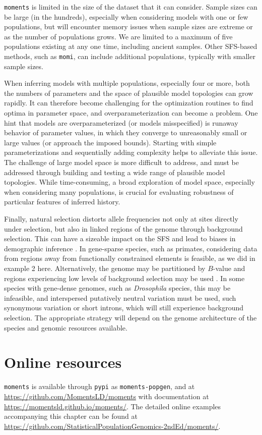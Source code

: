 \documentclass[]{article}
\newcommand{\moments}{\texttt{moments}\xspace}
\newcommand{\momi}{\texttt{momi}\xspace}
\begin{document}
\moments is limited in the size of the dataset that it can consider. Sample
sizes can be large (in the hundreds), especially when considering models with
one or few populations, but will encounter memory issues when sample sizes are
extreme or as the number of populations grows. We are limited to a maximum of
five populations existing at any one time, including ancient samples. Other
SFS-based methods, such as \momi \citep{kamm2020efficiently, dilber2024faster},
can include additional populations, typically with smaller sample sizes.

When inferring models with multiple populations, especially four or more, both
the numbers of parameters and the space of plausible model topologies can grow
rapidly. It can therefore become challenging for the optimization routines to
find optima in parameter space, and overparameterization can become a problem.
One hint that models are overparameterized (or models misspecified) is runaway
behavior of parameter values, in which they converge to unreasonably small or
large values (or approach the imposed bounds). Starting with simple
parameterizations and sequentially adding complexity helps to alleviate this
issue. The challenge of large model space is more difficult to address, and
must be addressed through building and testing a wide range of plausible model
topologies. While time-consuming, a broad exploration of model space,
especially when considering many populations, is crucial for evaluating
robustness of particular features of inferred history.

Finally, natural selection distorts allele frequencies not only at sites
directly under selection, but also in linked regions of the genome through
background selection. This can have a sizeable impact on the SFS and lead to
biases in demographic inference \citep{ewing2016consequences, johri2021impact}.
In gene-sparse species, such as primates, considering data from regions away
from functionally constrained elements is feasible, as we did in example 2
here.  Alternatively, the genome may be partitioned by $B$-value \citep[a
measure of the local strength of background
selectionk,][]{mcvicker2009widespread} and regions experiencing low levels of
background selection may be used \citep[for an example,
see][]{medina2023demographic}. In some species with gene-dense genomes, such as
\emph{Drosophila} species, this may be infeasible, and interspersed putatively
neutral variation must be used, such synonymous variation or short introns,
which will still experience background selection. The appropriate strategy will
depend on the genome architecture of the species and genomic resources
available.


\section*{Online resources} \moments is available through \texttt{pypi} as
\texttt{moments-popgen}, and at \url{https://github.com/MomentsLD/moments} with
documentation at \url{https://momentsld.github.io/moments/}. The detailed
online examples accompanying this chapter can be found at
\url{https://github.com/StatisticalPopulationGenomics-2ndEd/moments/}.



\end{document}
